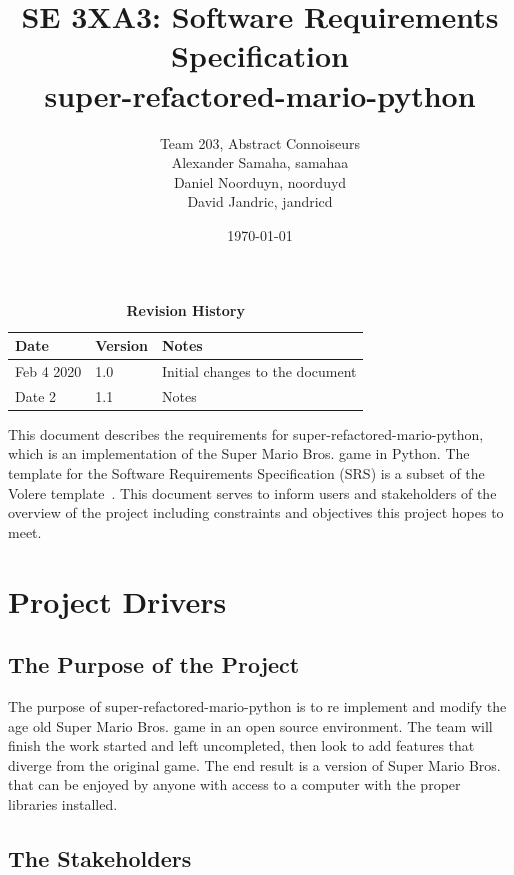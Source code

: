 \documentclass[12pt, titlepage]{article}
\title{SE 3XA3: Software Requirements Specification\\super-refactored-mario-python}
\author{Team 203, Abstract Connoiseurs
		\\ Alexander Samaha, samahaa
		\\ Daniel Noorduyn, noorduyd
		\\ David Jandric, jandricd
}
\date{\today}
\begin{document}
\maketitle

\tableofcontents
\listoftables
\listoffigures

\begin{table}[bp]
\caption{\bf Revision History}
\begin{tabularx}{\textwidth}{p{3cm}p{2cm}X}
\toprule {\bf Date} & {\bf Version} & {\bf Notes}\\
\midrule
Feb 4 2020 & 1.0 & Initial changes to the document \\
Date 2 & 1.1 & Notes\\
\bottomrule
\end{tabularx}
\end{table}

\newpage


This document describes the requirements for super-refactored-mario-python, which is an implementation of the Super Mario Bros. game in Python. The template for the Software
Requirements Specification (SRS) is a subset of the Volere
template~\citep{RobertsonAndRobertson2012}. This document serves to inform users and stakeholders of the overview of the project including constraints and objectives this project hopes to meet.

\section{Project Drivers}

\subsection{The Purpose of the Project}
    The purpose of super-refactored-mario-python is to re implement and modify the age old Super Mario Bros. game in an open source environment. The team will finish the work started and left uncompleted, then look to add features that diverge from the original game. The end result is a version of Super Mario Bros. that can be enjoyed by anyone with access to a computer with the proper libraries installed.

\subsection{The Stakeholders}
\end{document}
